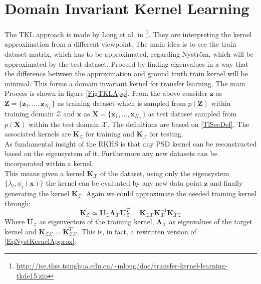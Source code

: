 \section{Domain Invariant Kernel Learning}\label{InSecTrans}
The \ac{TKL} approach is made by Long et al. in  \cite{Long.2015}\footnote{\url{http://ise.thss.tsinghua.edu.cn/~mlong/doc/transfer-kernel-learning-tkde15.zip}}.
They are interpreting the kernel approximation from a different viewpoint.
The main idea is to see the train dataset-matrix, which has to be approximated, regarding Nyström, which will be approximated by the test dataset. Proceed by finding eigenvalues in a way that the difference between the approximation and ground truth train kernel will be minimal. This forms a domain invariant kernel for transfer learning.\cite{Long.2015}
The main Process is shown in figure \ref{FigTKLApp}.\newline 
From the above consider $\mathbf{z}$ as $\mathbf{Z}=\{\mathbf{z}_1,\dots,\mathbf{z}_{N_\mathcal{Z}}\}$ as training dataset which is sampled from $p(\mathbf{Z})$ within training domain $\mathcal{Z}$ and $\mathbf{x}$ as $\mathbf{X}=\{\mathbf{x}_1,\dots,\mathbf{x}_{N_\mathcal{X}}\}$ as test dataset sampled from $p(\mathbf{X})$ within the test domain $\mathcal{X}$.
The definitions are based on \ref{TlSecDef}.
The associated kernels are $\mathbf{K}_\mathcal{Z}$ for training and $\mathbf{K}_\mathcal{X}$ for testing.\\
As fundamental insight of the \acs{RKHS} is that any \ac{PSD} kernel can be reconstructed based on the eigensystem of it. Furthermore any new datasets can be incorporated within a kernel.\cite{Long.2015}\\
This means given a kernel $\mathbf{K}_\mathcal{X}$ of the dataset, using only the eigensystem $\{\lambda_i,\phi_i(\mathbf{x})\}$ the kernel can be evaluated by any new data point $\mathbf{z}$ and finally generating the kernel $\mathbf{K}_\mathcal{Z}$.
Again we could approximate the needed training kernel through:\cite{Long.2015}
\begin{equation}\label{EqTrainTestApprox}
	\mathbf{K}_\mathcal{Z} \simeq \mathbf{U}_\mathcal{Z}\boldsymbol{\Lambda}_\mathcal{X} \mathbf{U}_\mathcal{Z}^T = \mathbf{K}_\mathcal{ZX}\mathbf{K}_\mathcal{X}^{-1}\mathbf{K}_\mathcal{XZ}
\end{equation}
Where $\mathbf{U}_\mathcal{Z}$ as eigenvectors of the training kernel, $\boldsymbol{\Lambda}_\mathcal{X}$ as eigenvalues of the target kernel and $\mathbf{K}_\mathcal{ZX} = \mathbf{K}_\mathcal{ZX}^T$.
This is, in fact, a rewritten version of \eqref{EqNystKernelApprox}.\\
